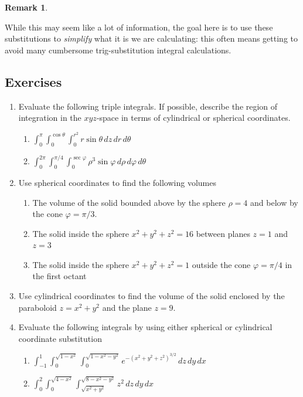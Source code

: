 \documentclass[12pt]{article}
\numberwithin{equation}{subsection}
\numberwithin{figure}{subsection}
\theoremstyle{note}
\newtheorem{remark}[subsection]{Remark}
\begin{document}
{\begin{remark}
 \end{remark}

While this may seem like a lot of information, the goal here is to use these substitutions to \textit{simplify} what it is we are calculating: this often means getting to avoid many cumbersome trig-substitution integral calculations.

\subsection{Exercises}
\begin{enumerate}[label=\arabic*.]
\item Evaluate the following triple integrals. If possible, describe the region of integration in the $xyz$-space in terms of cylindrical or spherical coordinates.

\begin{enumerate}
	\item $\displaystyle \int_0^{\pi} \int_0^{\cos \theta} \int_0^{r^2} r\sin \theta \,dz  \,dr\, d\theta$
	\item $\displaystyle \int_0^{2\pi} \int_{0}^{\pi/4} \int_0^{\sec \varphi}  \rho^3 \sin \varphi \,d \rho\,d\varphi\,d\theta$
\end{enumerate}

\item Use spherical coordinates to find the following volumes

\begin{enumerate}
	\item The volume of the solid bounded above by the sphere $\rho=4$ and below by the cone $\varphi=\pi/3$. 
	\item The solid inside the sphere $x^2+y^2+z^2=16$ between planes $z=1$ and $z=3$
	\item The solid inside the sphere $x^2+y^2+z^2=1$ outside the cone $\varphi=\pi/4$ in the first octant
\end{enumerate}

\item  Use cylindrical coordinates to find the volume of the solid enclosed by the paraboloid $z=x^2+y^2$ and the plane $z=9$. 

\item Evaluate the following integrals by using either spherical or cylindrical coordinate substitution

\begin{enumerate}
	\item $\displaystyle \int_{-1}^{1} \int_0^{\sqrt{1-x^2}} \int_0^{\sqrt{1-x^2-y^2}}e^{-(x^2+y^2+z^2)^{3/2}} \,dz \,dy \, dx$
	\item $\displaystyle \int_{0}^{2} \int_0^{\sqrt{4-x^2}} \int_{\sqrt{x^2+y^2}}^{\sqrt{8-x^2-y^2}} z^2 \,dz \,dy \, dx$
\end{enumerate}


\end{enumerate}}
\end{document}
